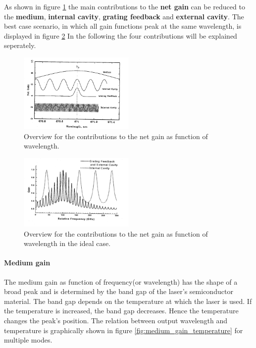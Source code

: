 As shown in figure \ref{fig:gain_overview} the main contributions
to the \textbf{net gain} can be reduced to
the \textbf{medium}, \textbf{internal cavity}, \textbf{grating feedback}
and  \textbf{external cavity}.
The best case scenario, in which all gain functions peak at the
same wavelength, is displayed in figure \ref{fig:ideal_gain_overview}
In the following the four contributions will be explained seperately.


\FloatBarrier
\begin{figure}
  \includegraphics[width=0.5\textwidth]{gain_overview.png}
  \caption{Overview for the contributions to the net gain as function of
            wavelength.\cite{V60}}
  \label{fig:gain_overview}
\end{figure}
\FloatBarrier

\FloatBarrier
\begin{figure}
  \includegraphics[width=0.5\textwidth]{ideal_gain_overview.png}
  \caption{Overview for the contributions to the net gain as function of
            wavelength in the ideal case.\cite{V60}}
  \label{fig:ideal_gain_overview}
\end{figure}
\FloatBarrier


\paragraph{Medium gain}
The medium gain as function of frequency(or wavelength) has
the shape of a broad peak and is determined by the band gap of
the laser's semiconductor material.
The band gap depends on the temperature at which the laser is used.
If the temperature is increased, the band gap decreases.
Hence the temperature changes the peak's position.
The relation between output wavelength and
temperature is graphically shown
in figure \ref{fig:medium_gain_temperature}
for multiple modes.



